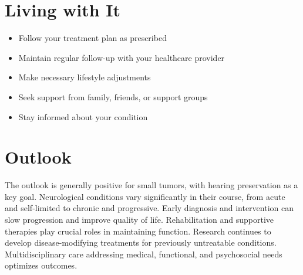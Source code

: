 \section{Living with It}
\begin{itemize}[noitemsep]
  \item Follow your treatment plan as prescribed
  \item Maintain regular follow-up with your healthcare provider
  \item Make necessary lifestyle adjustments
  \item Seek support from family, friends, or support groups
  \item Stay informed about your condition
\end{itemize}
\section{Outlook}
The outlook is generally positive for small tumors, with hearing preservation as a key goal. Neurological conditions vary significantly in their course, from acute and self-limited to chronic and progressive. Early diagnosis and intervention can slow progression and improve quality of life. Rehabilitation and supportive therapies play crucial roles in maintaining function. Research continues to develop disease-modifying treatments for previously untreatable conditions. Multidisciplinary care addressing medical, functional, and psychosocial needs optimizes outcomes.

